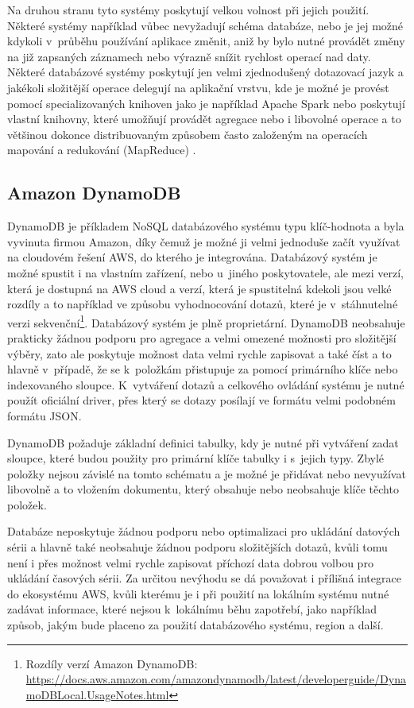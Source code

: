 Na druhou stranu tyto systémy poskytují velkou volnost při jejich použití. Některé systémy například vůbec nevyžadují schéma databáze, nebo je jej možné kdykoli v~průběhu používání aplikace změnit, aniž by bylo nutné provádět změny na již zapsaných záznamech nebo výrazně snížit rychlost operací nad daty. Některé databázové systémy poskytují jen velmi zjednodušený dotazovací jazyk a jakékoli složitější operace delegují na aplikační vrstvu, kde je možné je provést pomocí specializovaných knihoven jako je například Apache Spark \cite{meng2016mllib} nebo poskytují vlastní knihovny, které umožňují provádět agregace nebo i libovolné operace a to většinou dokonce distribuovaným způsobem často založeným na operacích mapování a redukování (MapReduce) \cite{10.1145/1327452.1327492}.

\subsection{Amazon DynamoDB}
\label{dynamodb}
DynamoDB je příkladem NoSQL databázového systému typu klíč-hodnota a byla vyvinuta firmou Amazon, díky čemuž je možné ji velmi jednoduše začít využívat na cloudovém řešení AWS, do kterého je integrována. Databázový systém je možné spustit i na vlastním zařízení, nebo u~jiného poskytovatele, ale mezi verzí, která je dostupná na AWS cloud a verzí, která je spustitelná kdekoli jsou velké rozdíly a to například ve způsobu vyhodnocování dotazů, které je v~stáhnutelné verzi sekvenční\footnote{Rozdíly verzí Amazon DynamoDB: \url{https://docs.aws.amazon.com/amazondynamodb/latest/developerguide/DynamoDBLocal.UsageNotes.html}}. Databázový systém je plně proprietární. DynamoDB neobsahuje prakticky žádnou podporu pro agregace a velmi omezené možnosti pro složitější výběry, zato ale poskytuje možnost data velmi rychle zapisovat a také číst a to hlavně v~případě, že se k~položkám přistupuje za pomocí primárního klíče nebo indexovaného sloupce. K~vytváření dotazů a celkového ovládání systému je nutné použít oficiální driver, přes který se dotazy posílají ve formátu velmi podobném formátu JSON.

DynamoDB požaduje základní definici tabulky, kdy je nutné při vytváření zadat sloupce, které budou použity pro primární klíče tabulky i s~jejich typy. Zbylé položky nejsou závislé na tomto schématu a je možné je přidávat nebo nevyužívat libovolně a to vložením dokumentu, který obsahuje nebo neobsahuje klíče těchto položek. 

Databáze neposkytuje žádnou podporu nebo optimalizaci pro ukládání datových sérii a hlavně také neobsahuje žádnou podporu složitějších dotazů, kvůli tomu není i přes možnost velmi rychle zapisovat příchozí data dobrou volbou pro ukládání časových sérii. Za určitou nevýhodu se dá považovat i přílišná integrace do ekosystému AWS, kvůli kterému je i při použití na lokálním systému nutné zadávat informace, které nejsou k~lokálnímu běhu zapotřebí, jako například způsob, jakým bude placeno za použití databázového systému, region a další.

